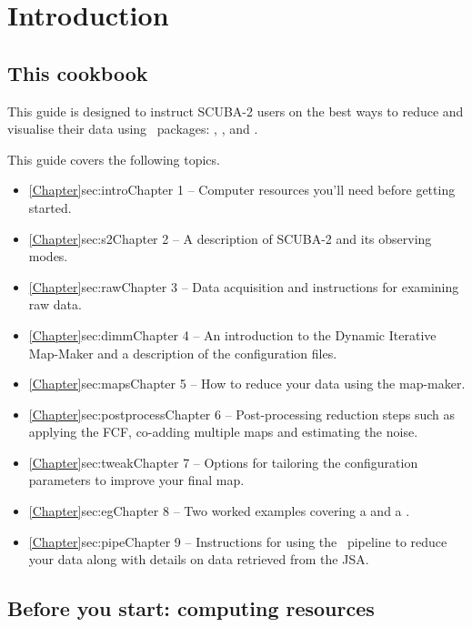 \documentclass[11pt,oneside,chapters]{starlink}
\begin{document}
\chapter{Introduction}
\label{sec:intro}

\renewcommand{\thepage}{\arabic{page}}
\setcounter{page}{1}

\section{This cookbook}

This guide is designed to instruct SCUBA-2 users on the best ways to
reduce and visualise their data using \starlink\ packages:
\smurf \cite{smurf}, \Kappa \cite{kappa}, \gaia \cite{gaia} and \picard
\cite{picard}.

This guide covers the following topics.
\begin{itemize}
\itemsep0em
\item \cref{Chapter}{sec:intro}{Chapter 1} -- Computer resources you'll need before getting started.
\item \cref{Chapter}{sec:s2}{Chapter 2} -- A description of SCUBA-2 and its observing modes.
\item \cref{Chapter}{sec:raw}{Chapter 3}  -- Data acquisition and instructions for examining raw data.
\item \cref{Chapter}{sec:dimm}{Chapter 4}  -- An introduction to the Dynamic Iterative Map-Maker and a description of the configuration files.
\item \cref{Chapter}{sec:maps}{Chapter 5}  -- How to reduce your data using the map-maker.
\item \cref{Chapter}{sec:postprocess}{Chapter 6}  -- Post-processing reduction steps such as applying the FCF, co-adding multiple maps and estimating the noise.
\item \cref{Chapter}{sec:tweak}{Chapter 7}  -- Options for tailoring the configuration parameters to improve your final map.
\item \cref{Chapter}{sec:eg}{Chapter 8}  -- Two worked examples covering a  and a .
\item \cref{Chapter}{sec:pipe}{Chapter 9}  -- Instructions for using the \oracdr\ pipeline to reduce your data along with details on data retrieved from the JSA.
\end{itemize}


\section{ Before you start: computing resources}
\end{document}
